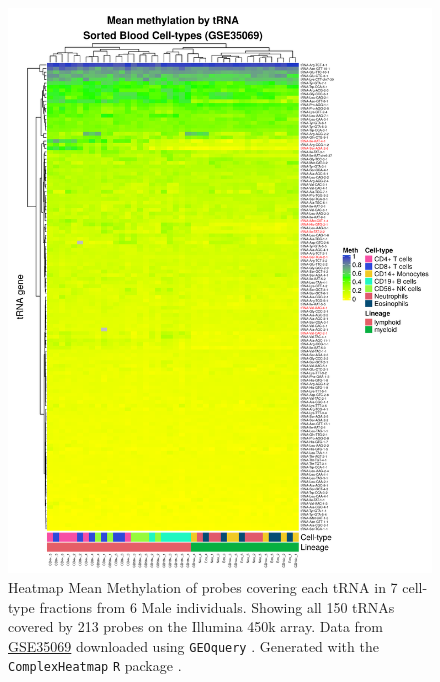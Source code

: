 \documentclass[
]{book}
\begin{document}
\begin{figure}

{\centering \includegraphics[width=0.9\linewidth]{./figs/meanMethbytRNAMatHeatmapLow_bl} 

}

\caption{Heatmap Mean Methylation of probes covering each tRNA in 7 cell-type fractions from 6 Male individuals. Showing all 150 tRNAs covered by 213 probes on the Illumina 450k array. Data from \href{https://www.ncbi.nlm.nih.gov/geo/query/acc.cgi?acc=GSE35069}{GSE35069} \citep{Reinius2012} downloaded using \texttt{GEOquery} \citep{Davis2007p}. Generated with the \texttt{ComplexHeatmap} \texttt{R} package \citep{Gu2016}.}\label{fig:meanMethbytRNAMatHeatmapLow}
\end{figure}
\end{document}
